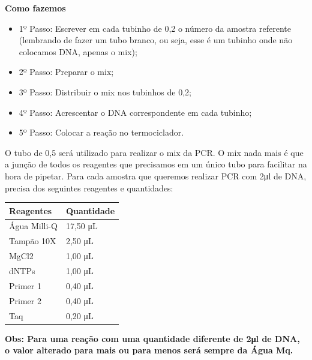 \documentclass[
  letterpaper,
  DIV=11,
  numbers=noendperiod]{scrreprt}
\begin{document}
\begin{tcolorbox}[enhanced jigsaw, colback=white, toprule=.15mm, rightrule=.15mm, opacityback=0, left=2mm, arc=.35mm, bottomrule=.15mm, breakable, leftrule=.75mm]
\begin{minipage}[t]{5.5mm}
\textcolor{quarto-callout-note-color}{\faInfo}
\end{minipage}%
\begin{minipage}[t]{\textwidth - 5.5mm}

\textbf{Como fazemos}\vspace{2mm}

\begin{itemize}
\item
  1º Passo: Escrever em cada tubinho de 0,2 o número da amostra
  referente (lembrando de fazer um tubo branco, ou seja, esse é um
  tubinho onde não colocamos DNA, apenas o mix);
\item
  2º Passo: Preparar o mix;
\item
  3º Passo: Distribuir o mix nos tubinhos de 0,2;
\item
  4º Passo: Acrescentar o DNA correspondente em cada tubinho;
\item
  5º Passo: Colocar a reação no termociclador.
\end{itemize}

\end{minipage}%
\end{tcolorbox}

O tubo de 0,5 será utilizado para realizar o mix da PCR. O mix nada mais
é que a junção de todos os reagentes que precisamos em um único tubo
para facilitar na hora de pipetar. Para cada amostra que queremos
realizar PCR com 2μl de DNA, precisa dos seguintes reagentes e
quantidades:

\begin{longtable}[]{@{}ll@{}}
\toprule\noalign{}
\textbf{Reagentes} & \textbf{Quantidade} \\
\midrule\noalign{}
\endhead
\bottomrule\noalign{}
\endlastfoot
Água Milli-Q & 17,50 μL \\
Tampão 10X & 2,50 μL \\
MgCl2 & 1,00 μL \\
dNTPs & 1,00 μL \\
Primer 1 & 0,40 μL \\
Primer 2 & 0,40 μL \\
Taq & 0,20 μL \\
\end{longtable}

\textbf{Obs: Para uma reação com uma quantidade diferente de 2μl de DNA,
o valor alterado para mais ou para menos será sempre da Água Mq.}
\end{document}
